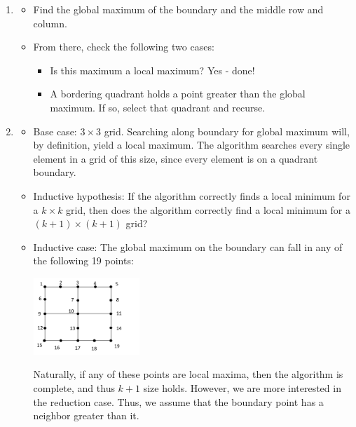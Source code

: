 \documentclass{article}
\begin{document}
\begin{enumerate}
\begin{enumerate}
            \item 
                \begin{itemize}
                    \item Find the global maximum of the boundary and the middle row and column.
                    \item From there, check the following two cases:
                        \begin{itemize}
                            \item Is this maximum a local maximum? Yes - done!
                            \item A bordering quadrant holds a point greater than the global maximum.
                                If so, select that quadrant and recurse.
                        \end{itemize}
                \end{itemize}
            
            \item 
                \begin{itemize}
                    \item Base case: $3 \times 3$ grid. Searching along boundary for global maximum
                    will, by definition, yield a local maximum. The algorithm searches every single
                    element in a grid of this size, since every element is on a quadrant boundary.
                    
                    \item Inductive hypothesis: If the algorithm correctly finds a local minimum for a 
                        $k \times k$ grid, then does the algorithm correctly find a local minimum for a 
                        $\left(k+1\right) \times \left(k+1\right)$ grid?
                        
                    \item Inductive case: The global maximum on the boundary can fall in any of the following 19
                    points:
                    
                    \begin{center}
                        \includegraphics[width=4cm]{img/h2-p4.png}
                    \end{center}
                    Naturally, if any of these points are local maxima, then the algorithm is complete, and thus
                    $k + 1$ size holds. However, we are more interested in the reduction case.
                    Thus, we assume that the boundary point has a neighbor greater than it.
                    

\end{itemize}
\end{enumerate}
\end{enumerate}
\end{document}
